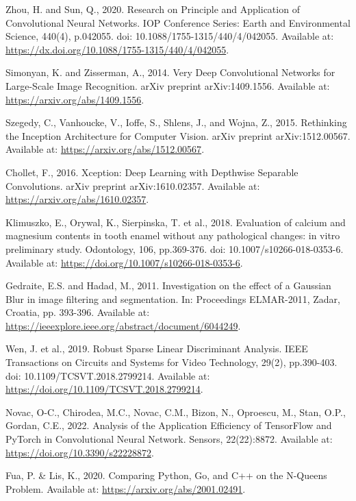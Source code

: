 \begin{thebibliography}{99}
    Zhou, H. and Sun, Q., 2020. Research on Principle and Application of Convolutional Neural Networks. IOP Conference Series: Earth and Environmental Science, 440(4), p.042055. doi: 10.1088/1755-1315/440/4/042055. Available at: \url{https://dx.doi.org/10.1088/1755-1315/440/4/042055}.

    Simonyan, K. and Zisserman, A., 2014. Very Deep Convolutional Networks for Large-Scale Image Recognition. arXiv preprint arXiv:1409.1556. Available at: \url{https://arxiv.org/abs/1409.1556}.
    
    Szegedy, C., Vanhoucke, V., Ioffe, S., Shlens, J., and Wojna, Z., 2015. Rethinking the Inception Architecture for Computer Vision. arXiv preprint arXiv:1512.00567. Available at: \url{https://arxiv.org/abs/1512.00567}.
    
    Chollet, F., 2016. Xception: Deep Learning with Depthwise Separable Convolutions. arXiv preprint arXiv:1610.02357. Available at: \url{https://arxiv.org/abs/1610.02357}.

    Klimuszko, E., Orywal, K., Sierpinska, T. et al., 2018. Evaluation of calcium and magnesium contents in tooth enamel without any pathological changes: in vitro preliminary study. Odontology, 106, pp.369-376. doi: 10.1007/s10266-018-0353-6. Available at: \url{https://doi.org/10.1007/s10266-018-0353-6}.

    Gedraite, E.S. and Hadad, M., 2011. Investigation on the effect of a Gaussian Blur in image filtering and segmentation. In: Proceedings ELMAR-2011, Zadar, Croatia, pp. 393-396. Available at: \url{https://ieeexplore.ieee.org/abstract/document/6044249}.

    Wen, J. et al., 2019. Robust Sparse Linear Discriminant Analysis. IEEE Transactions on Circuits and Systems for Video Technology, 29(2), pp.390-403. doi: 10.1109/TCSVT.2018.2799214. Available at: \url{https://doi.org/10.1109/TCSVT.2018.2799214}.

    Novac, O-C., Chirodea, M.C., Novac, C.M., Bizon, N., Oproescu, M., Stan, O.P., Gordan, C.E., 2022. Analysis of the Application Efficiency of TensorFlow and PyTorch in Convolutional Neural Network. Sensors, 22(22):8872. Available at: \url{https://doi.org/10.3390/s22228872}.

    Fua, P. \& Lis, K., 2020. Comparing Python, Go, and C++ on the N-Queens Problem. Available at: \url{https://arxiv.org/abs/2001.02491}.
    
\end{thebibliography}